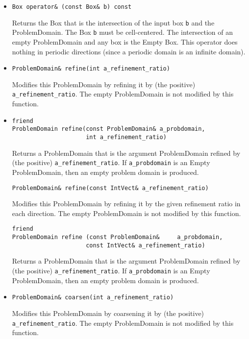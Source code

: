\begin{itemize}
\item
\begin{verbatim}
Box operator& (const Box& b) const
\end{verbatim}
Returns the Box that is the intersection of the input box {\tt b} and
the ProblemDomain.  The Box {\tt b} must be cell-centered.  The
intersection of an empty ProblemDomain and any box is the Empty Box.
This operator does nothing in periodic directions (since a periodic
domain is an infinite domain).

\item
\begin{verbatim}
ProblemDomain& refine(int a_refinement_ratio)
\end{verbatim}
Modifies this ProblemDomain by refining it by (the positive) {\tt
a\_refinement\_ratio}. The empty ProblemDomain is not modified by this
function. 

\item
\begin{verbatim}
friend
ProblemDomain refine(const ProblemDomain& a_probdomain,
                     int a_refinement_ratio)
\end{verbatim}
Returns a ProblemDomain that is the argument ProblemDomain refined by
(the positive) {\tt a\_refinement\_ratio}.  If {\tt a\_probdomain} is
an Empty ProblemDomain, then an empty problem domain is produced.

\begin{verbatim}
ProblemDomain& refine(const IntVect& a_refinement_ratio)
\end{verbatim} 
Modifies this ProblemDomain by refining it by the given refinement
ratio in each direction.  The empty ProblemDomain is not modified by
this function.

\begin{verbatim}
friend 
ProblemDomain refine (const ProblemDomain&     a_probdomain,
                     const IntVect& a_refinement_ratio)
\end{verbatim}
Returns a ProblemDomain that is the argument ProblemDomain refined by
(the positive) {\tt a\_refinement\_ratio}.  If {\tt a\_probdomain} is
an Empty ProblemDomain, then an empty problem domain is produced.


\item
\begin{verbatim}
ProblemDomain& coarsen(int a_refinement_ratio)
\end{verbatim}
Modifies this ProblemDomain by coarsening it by (the positive) {\tt
a\_refinement\_ratio}. The empty ProblemDomain is not modified by this
function. 


\end{itemize}
